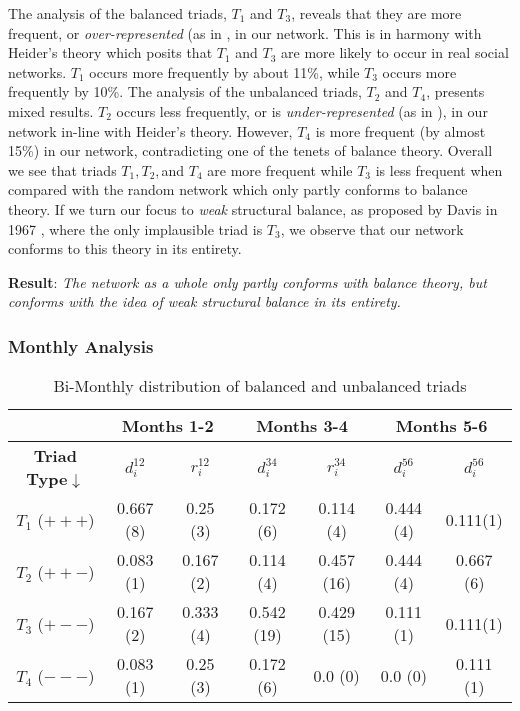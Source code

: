 The analysis of the balanced triads, $T_1$ and $T_3$, reveals that they are more frequent, or \textit{over-represented} (as in \cite{Leskovec:2010hw}, in our network. 
This is in harmony with Heider's theory which posits that $T_1$ and $T_3$ are more likely to occur in real social networks. $T_1$ occurs more frequently by about 11\%, while $T_3$ occurs more frequently by 10\%. 
The analysis of the unbalanced triads, $T_2$ and $T_4$, presents mixed results. 
$T_2$ occurs less frequently, or is \textit{under-represented} (as in \cite{Leskovec:2010hw}), in our network in-line with Heider's theory. 
However, $T_4$ is more frequent (by almost 15\%) in our network, contradicting one of the tenets of balance theory. 
Overall we see that triads $T_1, T_2, $and $T_4$ are more frequent while $T_3$ is less frequent when compared with the random network which only partly conforms to balance theory. 
If we turn our focus to \emph{weak} structural balance, as proposed by Davis in 1967 \cite{Davis1967Clustering}, where the only implausible triad is $T_3$, we observe that our network conforms to this theory in its entirety. 

\textbf{Result}: \textit{The network as a whole only partly conforms with balance theory, but conforms with the idea of weak structural balance in its entirety.}
\newline
\subsubsection{\textbf{Monthly Analysis}}
\begin{table*}
\centering
\caption{Bi-Monthly distribution of balanced and unbalanced triads}
\label{table:balanceMDist}
\begin{tabular}{c|c|c|c|c|c|c|}
\cline{2-7}
 & \multicolumn{2}{c|}{\textbf{Months 1-2}} & \multicolumn{2}{c|}{\textbf{Months 3-4}} & \multicolumn{2}{c|}{\textbf{Months 5-6}} \\ \hline
\multicolumn{1}{|c|}{\textbf{Triad Type}$\downarrow$} & $d_{i}^{12}$ & $r_{i}^{12}$ & $d_{i}^{34}$ & $r_{i}^{34}$ & $d_{i}^{56}$ & $d_{i}^{56}$ \\ \hline
\multicolumn{1}{|c|}{$T_1$ ($+++$)} & 0.667 (8) & 0.25 (3) & 0.172 (6) & 0.114 (4) & 0.444 (4) & 0.111(1) \\ \hline
\multicolumn{1}{|c|}{$T_2$ ($++-$)} & 0.083 (1) & 0.167 (2) & 0.114 (4) & 0.457 (16) & 0.444 (4) & 0.667 (6) \\ \hline
\multicolumn{1}{|c|}{$T_3$ ($+--$)} & 0.167 (2) & 0.333 (4) & 0.542 (19) & 0.429 (15) & 0.111 (1) & 0.111(1) \\ \hline
\multicolumn{1}{|c|}{$T_4$ ($---$)} & 0.083 (1) & 0.25 (3) & 0.172 (6) & 0.0 (0) & 0.0 (0) & 0.111 (1) \\ \hline
\end{tabular}
\end{table*}

